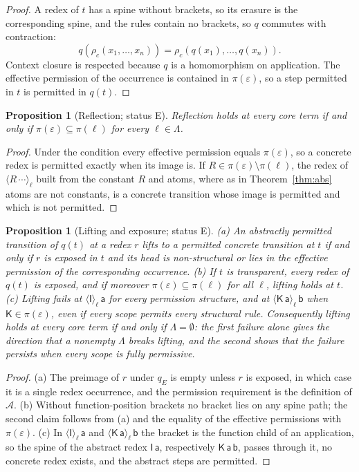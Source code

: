 \documentclass[11pt]{article}
\newtheorem{proposition}[theorem]{Proposition}
\theoremstyle{definition}
\theoremstyle{remark}
\newcommand{\cI}{\mathsf{I}}
\newcommand{\cK}{\mathsf{K}}
\newcommand{\br}[2]{\langle #1\rangle_{#2}}
\newcommand{\Et}{status E}
\begin{document}
\begin{proof}
A redex of $t$ has a spine without brackets, so its erasure is the corresponding spine, and the rules contain no brackets, so $q$ commutes with contraction:
\[
q(\rho_c(x_1,\dots,x_n))=\rho_c(q(x_1),\dots,q(x_n)).
\] Context closure is respected because $q$ is a homomorphism on application. The effective permission of the occurrence is contained in $\pi(\varepsilon)$, so a step permitted in $t$ is permitted in $q(t)$.
\end{proof}

\begin{proposition}[Reflection; \Et]\label{prop:reflect}
Reflection holds at every core term if and only if $\pi(\varepsilon)\subseteq\pi(\ell)$ for every $\ell\in\Lambda$.
\end{proposition}

\begin{proof}
Under the condition every effective permission equals $\pi(\varepsilon)$, so a concrete redex is permitted exactly when its image is. If $R\in\pi(\varepsilon)\setminus\pi(\ell)$, the redex of $\br{R\,\cdots}\ell$ built from the constant $R$ and atoms, where as in Theorem~\ref{thm:abs} atoms are not constants, is a concrete transition whose image is permitted and which is not permitted.
\end{proof}

\begin{proposition}[Lifting and exposure; \Et]\label{prop:lift}
(a) An abstractly permitted transition of $q(t)$ at a redex $r$ lifts to a permitted concrete transition at $t$ if and only if $r$ is exposed in $t$ and its head is non-structural or lies in the effective permission of the corresponding occurrence. (b) If $t$ is transparent, every redex of $q(t)$ is exposed, and if moreover $\pi(\varepsilon)\subseteq\pi(\ell)$ for all $\ell$, lifting holds at $t$. (c) Lifting fails at $\br{\cI}\ell\,\mathsf a$ for every permission structure, and at $\br{\cK\,\mathsf a}\ell\,\mathsf b$ when $\cK\in\pi(\varepsilon)$, even if every scope permits every structural rule. Consequently lifting holds at every core term if and only if $\Lambda=\emptyset$: the first failure alone gives the direction that a nonempty $\Lambda$ breaks lifting, and the second shows that the failure persists when every scope is fully permissive.
\end{proposition}

\begin{proof}
(a) The preimage of $r$ under $q_E$ is empty unless $r$ is exposed, in which case it is a single redex occurrence, and the permission requirement is the definition of $\mathcal A$. (b) Without function-position brackets no bracket lies on any spine path; the second claim follows from (a) and the equality of the effective permissions with $\pi(\varepsilon)$. (c) In $\br{\cI}\ell\,\mathsf a$ and $\br{\cK\,\mathsf a}\ell\,\mathsf b$ the bracket is the function child of an application, so the spine of the abstract redex $\cI\,\mathsf a$, respectively $\cK\,\mathsf a\,\mathsf b$, passes through it, no concrete redex exists, and the abstract steps are permitted.
\end{proof}
\end{document}
